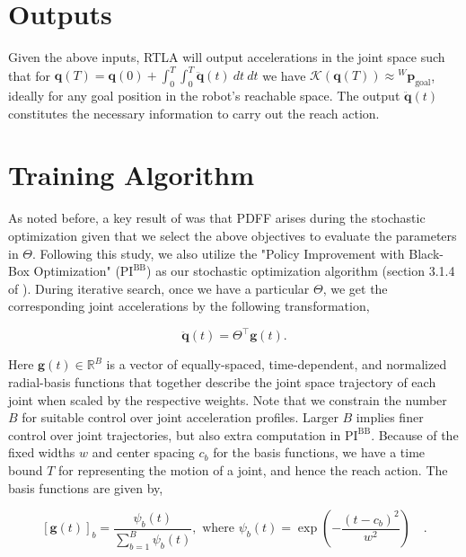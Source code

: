 \documentclass[10pt]{article}
\begin{document}
\section{Outputs}
Given the above inputs, RTLA will output accelerations in the joint space such that for $\mathbf{q}(T) = \mathbf{q}(0) + \int_0^T\int_0^{T}\ddot{\mathbf{q}}(t)\:dt\:dt$ we have $\mathcal{K}(\mathbf{q}(T)) \approx {^W}\mathbf{p}_{\text{goal}}$, ideally for any goal position in the robot's reachable space. The output $\ddot{\mathbf{q}}(t)$ constitutes the necessary information to carry out the reach action.

\section{Training Algorithm}
\label{sec:training_algo}
As noted before, a key result of \cite{pdff} was that PDFF arises during the stochastic optimization given that we select the above objectives to evaluate the parameters in $\Theta$. Following this study, we also utilize the "Policy Improvement with Black-Box Optimization" ($\text{PI}^{\text{BB}}$) as our stochastic optimization algorithm (section 3.1.4 of \cite{pdff}). During iterative search, once we have a particular $\Theta$, we get the corresponding joint accelerations by the following transformation,

\begin{equation}
\label{eqn:dmp_theta_to_qdd}
        \ddot{\mathbf{q}}(t) = \Theta^\top\mathbf{g}(t).
\end{equation}

Here $\mathbf{g}(t) \in \mathbb{R}^B$ is a vector of equally-spaced, time-dependent, and normalized radial-basis functions that together describe the joint space trajectory of each joint when scaled by the respective weights. Note that we constrain the number $B$ for suitable control over joint acceleration profiles. Larger $B$ implies finer control over joint trajectories, but also extra computation in $\text{PI}^{\text{BB}}$. Because of the fixed widths $w$ and center spacing $c_b$ for the basis functions, we have a time bound $T$ for representing the motion of a joint, and hence the reach action. The basis functions are given by,

\begin{equation}
\label{eqn:dmp_radial_basis}
    [\mathbf{g}(t)]_b = \frac{\psi_b(t)}{\sum_{b=1}^{B} \psi_b(t)}, \text{ where } \psi_b(t) = \exp{\left(-\frac{(t-c_b)^2}{w^2}\right)} \quad .
\end{equation}
\end{document}
